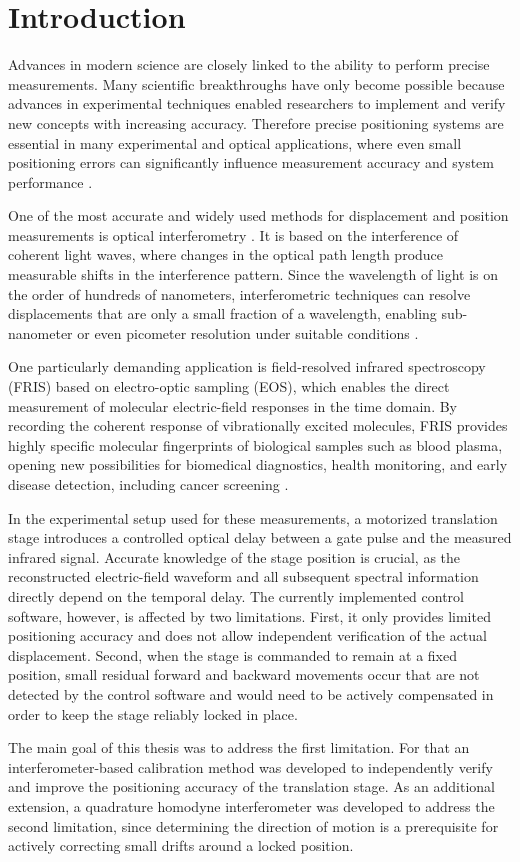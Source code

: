 \chapter{Introduction}
\thispagestyle{empty}

Advances in modern science are closely linked to the ability to perform precise measurements. Many scientific breakthroughs have only become possible because advances in experimental techniques enabled researchers to implement and verify new concepts with increasing accuracy.
Therefore precise positioning systems are essential in many experimental and optical
applications, where even small positioning errors can significantly influence
measurement accuracy and system performance . 

One of the most accurate and widely used methods for displacement and position measurements is optical interferometry . It is based on the interference of coherent light waves, where changes in the optical path length produce measurable shifts in the interference pattern. Since the wavelength of light is on the order of hundreds of nanometers, interferometric techniques can resolve displacements that are only a small fraction of a wavelength, enabling sub-nanometer or even picometer resolution under suitable conditions .

One particularly demanding application is field-resolved infrared spectroscopy (FRIS) based on electro-optic sampling (EOS), which enables the direct measurement of molecular electric-field responses in the time domain. By recording the coherent response of vibrationally excited molecules, FRIS provides highly specific molecular fingerprints of biological samples such as blood plasma, opening new possibilities for biomedical diagnostics, health monitoring, and early disease detection, including cancer screening .

In the experimental setup used for these measurements, a motorized translation stage introduces a controlled optical delay between a gate pulse and the measured infrared signal. Accurate knowledge of the stage position is crucial, as the reconstructed electric-field waveform and all subsequent spectral information directly depend on the temporal delay. The currently implemented control software, however, is affected by two limitations. First, it only provides limited positioning accuracy and does not allow independent verification of the actual displacement. Second, when the stage is commanded to remain at a fixed position, small residual forward and backward movements occur that are not detected by the control software and would need to be actively compensated in order to keep the stage reliably locked in place.

The main goal of this thesis was to address the first limitation. For that an interferometer-based
calibration method was developed to independently verify and improve the positioning accuracy of the translation stage. As an additional extension, a quadrature homodyne interferometer was developed to address the second limitation, since determining the direction of motion is a prerequisite for actively correcting small drifts around a locked position.
